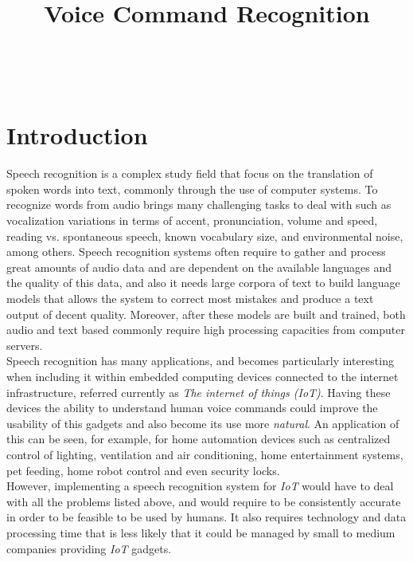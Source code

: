 \documentclass[anon]{CI}
\title[Voice Command Recognition]{Voice Command Recognition}
\author{\Name{Javier Fern\'andez} \Email{javierfdr@gmail.com}\\
 \AND
 \Name{Alejandro Hern\'andez} \Email{alejandro.ajhr@gmail.com}\\
 }
\begin{document}
\maketitle


\section{Introduction}

Speech recognition is a complex study field that focus on the translation of spoken words into text, commonly through the use of computer systems. To recognize words from audio brings many challenging tasks to deal with such as vocalization variations in terms of accent, pronunciation, volume and speed, reading vs. spontaneous speech, known vocabulary size, and environmental noise, among others. Speech recognition systems often require to gather and process great amounts of audio data and are dependent on the available languages and the quality of this data, and also it needs large corpora of text to build language models that allows the system to correct most mistakes and produce a text output of decent quality. Moreover, after these models are built and trained, both audio and text based commonly require high processing capacities from computer servers.\\

Speech recognition has many applications, and becomes particularly interesting when including it within embedded computing devices connected to the internet infrastructure, referred currently as \emph{The internet of things (IoT)}. Having these devices the ability to understand human voice commands could improve the usability of this gadgets and also become its use more \emph{natural}. An application of this can be seen, for example, for home automation devices such as  centralized control of lighting, ventilation and air conditioning, home entertainment systems, pet feeding, home robot control and even security locks.\\
However, implementing a speech recognition system for \emph{IoT} would have to deal with all the problems listed above, and would require to be consistently accurate in order to be feasible to be used by humans. It also requires technology and data processing time that is less likely that it could be managed by small to medium companies providing \emph{IoT} gadgets.\\
\end{document}
